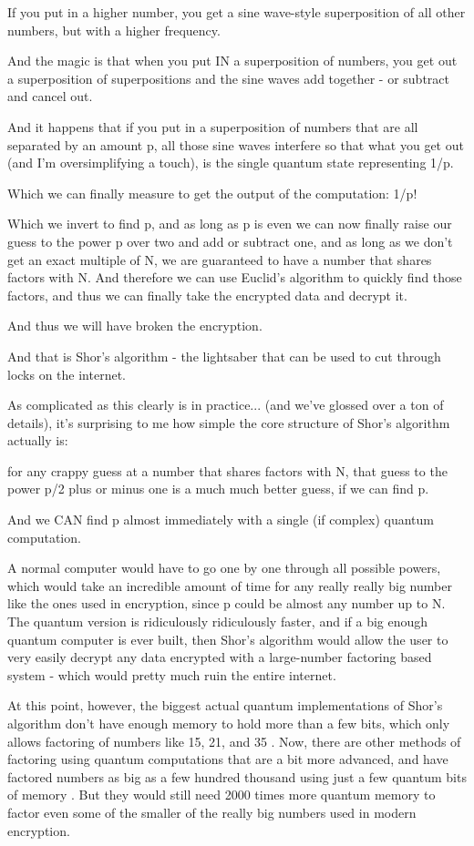 \documentclass[../main.tex]{subfiles}
\begin{document}
If you put in a higher number, you get a sine wave-style superposition of all other numbers, but with a higher frequency.

And the magic is that when you put IN a superposition of numbers, you get out a superposition of superpositions and the sine waves add together - or subtract and cancel out.

And it happens that if you put in a superposition of numbers that are all separated by an amount p, all those sine waves interfere so that what you get out (and I’m oversimplifying a touch), is the single quantum state representing 1/p.

Which we can finally measure to get the output of the computation: 1/p!

Which we invert to find p, and as long as p is even we can now finally raise our guess to the power p over two and add or subtract one, and as long as we don’t get an exact multiple of N, we are guaranteed to have a number that shares factors with N. And therefore we can use Euclid’s algorithm to quickly find those factors, and thus we can finally take the encrypted data and decrypt it.

And thus we will have broken the encryption.

And that is Shor’s algorithm - the lightsaber that can be used to cut through locks on the internet.

As complicated as this clearly is in practice... (and we've glossed over a ton of details), it’s surprising to me how simple the core structure of Shor's algorithm actually is:

for any crappy guess at a number that shares factors with N, that guess to the power p/2 plus or minus one is a much much better guess, if we can find p.

And we CAN find p almost immediately with a single (if complex) quantum computation.

A normal computer would have to go one by one through all possible powers, which would take an incredible amount of time for any really really big number like the ones used in encryption, since p could be almost any number up to N. The quantum version is ridiculously ridiculously faster, and if a big enough quantum computer is ever built, then Shor’s algorithm would allow the user to very easily decrypt any data encrypted with a large-number factoring based system - which would pretty much ruin the entire internet.

At this point, however, the biggest actual quantum implementations of Shor’s algorithm don’t have enough memory to hold more than a few bits, which only allows factoring of numbers like 15, 21, and 35 . Now, there are other methods of factoring using quantum computations that are a bit more advanced, and have factored numbers as big as a few hundred thousand using just a few quantum bits of memory . But they would still need 2000 times more quantum memory to factor even some of the smaller of the really big numbers used in modern encryption.
\end{document}
